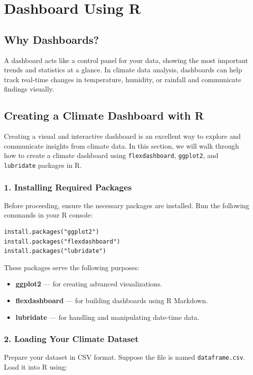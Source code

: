 \section{Dashboard Using R}

\subsection*{Why Dashboards?}
A dashboard acts like a control panel for your data, showing the most important trends and statistics at a glance. In climate data analysis, dashboards can help track real-time changes in temperature, humidity, or rainfall and communicate findings visually.

\subsection*{Creating a Climate Dashboard with R}
Creating a visual and interactive dashboard is an excellent way to explore and communicate insights from climate data. In this section, we will walk through how to create a climate dashboard using \texttt{flexdashboard}, \texttt{ggplot2}, and \texttt{lubridate} packages in R.

\subsubsection*{1. Installing Required Packages}
Before proceeding, ensure the necessary packages are installed. Run the following commands in your R console:
\begin{verbatim}
install.packages("ggplot2") 
install.packages("flexdashboard") 
install.packages("lubridate")
\end{verbatim}

These packages serve the following purposes:
\begin{itemize}
    \item \textbf{ggplot2} — for creating advanced visualizations.
    \item \textbf{flexdashboard} — for building dashboards using R Markdown.
    \item \textbf{lubridate} — for handling and manipulating date-time data.
\end{itemize}

\subsubsection*{2. Loading Your Climate Dataset}
Prepare your dataset in CSV format. Suppose the file is named \texttt{dataframe.csv}. Load it into R using:

